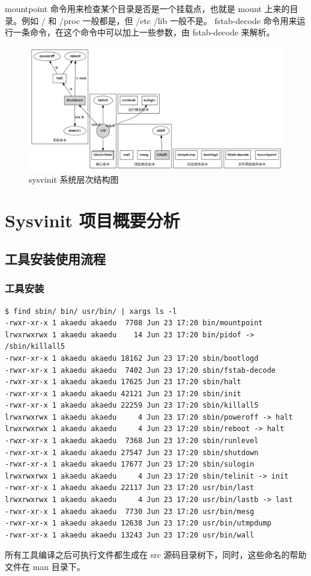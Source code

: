 mountpoint 命令用来检查某个目录是否是一个挂载点，也就是 mount
上来的目录。例如 / 和 /proc 一般都是，但 /etc /lib 一般不是。
fstab-decode 命令用来运行一条命令，在这个命令中可以加上一些参数，由
fstab-decode 来解析。

\begin{figure}[htbp]
\centering
\includegraphics{./figures/sys.png}
\caption{sysvinit 系统层次结构图}
\end{figure}

\chapter{Sysvinit 项目概要分析}

\section{工具安装使用流程}

\subsection{工具安装}

{\begin{shaded}\begin{verbatim}
$ find sbin/ bin/ usr/bin/ | xargs ls -l
-rwxr-xr-x 1 akaedu akaedu  7708 Jun 23 17:20 bin/mountpoint
lrwxrwxrwx 1 akaedu akaedu    14 Jun 23 17:20 bin/pidof -> /sbin/killall5
-rwxr-xr-x 1 akaedu akaedu 18162 Jun 23 17:20 sbin/bootlogd
-rwxr-xr-x 1 akaedu akaedu  7402 Jun 23 17:20 sbin/fstab-decode
-rwxr-xr-x 1 akaedu akaedu 17625 Jun 23 17:20 sbin/halt
-rwxr-xr-x 1 akaedu akaedu 42121 Jun 23 17:20 sbin/init
-rwxr-xr-x 1 akaedu akaedu 22259 Jun 23 17:20 sbin/killall5
lrwxrwxrwx 1 akaedu akaedu     4 Jun 23 17:20 sbin/poweroff -> halt
lrwxrwxrwx 1 akaedu akaedu     4 Jun 23 17:20 sbin/reboot -> halt
-rwxr-xr-x 1 akaedu akaedu  7368 Jun 23 17:20 sbin/runlevel
-rwxr-xr-x 1 akaedu akaedu 27547 Jun 23 17:20 sbin/shutdown
-rwxr-xr-x 1 akaedu akaedu 17677 Jun 23 17:20 sbin/sulogin
lrwxrwxrwx 1 akaedu akaedu     4 Jun 23 17:20 sbin/telinit -> init
-rwxr-xr-x 1 akaedu akaedu 22117 Jun 23 17:20 usr/bin/last
lrwxrwxrwx 1 akaedu akaedu     4 Jun 23 17:20 usr/bin/lastb -> last
-rwxr-xr-x 1 akaedu akaedu  7730 Jun 23 17:20 usr/bin/mesg
-rwxr-xr-x 1 akaedu akaedu 12638 Jun 23 17:20 usr/bin/utmpdump
-rwxr-xr-x 1 akaedu akaedu 13243 Jun 23 17:20 usr/bin/wall
\end{verbatim}\end{shaded}}
所有工具编译之后可执行文件都生成在 src
源码目录树下，同时，这些命名的帮助文件在 man 目录下。

